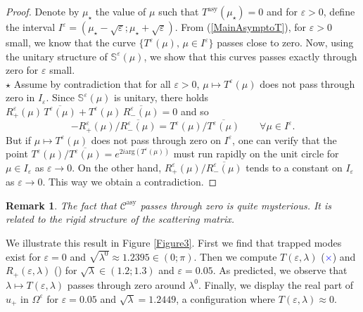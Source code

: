 \documentclass[11pt,a4paper]{report}
\newcommand{\eps}{\varepsilon}
\newcommand{\Om}{\Omega}
\newcommand{\mrm}[1]{\mathrm{#1}}
\newtheorem{remark}[theorem]{Remark}
\begin{document}
\begin{proof}
\newline
Denote by $\mu_{\star}$ the value of $\mu$ such that $T^{\mrm{asy}}(\mu_{\star})=0$ and for $\eps>0$, define the interval $I^{\eps}=(\mu_{\star}-\sqrt{\eps};\mu_{\star}+\sqrt{\eps})$.
From (\ref{MainAsymptoT}), for $\eps>0$ small, we know that the curve $\{T^{\eps}(\mu),\,\mu\in I^{\eps}\}$ passes close to zero. Now, using the unitary structure of $\mathbb{S}^{\eps}(\mu)$, we show that this curves passes exactly through zero for $\eps$ small. \\[2pt]
$\star$ 
Assume by contradiction that for all $\eps>0$, $\mu\mapsto T^{\eps}(\mu)$ does not pass through zero in $I_\eps$. Since $\mathbb{S}^{\eps}(\mu)$ is unitary, there holds $R^{\eps}_+(\mu)\,\overline{T^{\eps}(\mu)}+T^{\eps}(\mu)\,\overline{R^{\eps}_-(\mu)}=0$ and so
\[
-R^{\eps}_+(\mu)/\overline{R^{\eps}_-(\mu)}=T^{\eps}(\mu)/\overline{T^{\eps}(\mu)}\qquad\mbox{$\forall\mu\in I^{\eps}$}.
\]
But if $\mu\mapsto T^{\eps}(\mu)$ does not pass through zero on $I^{\eps}$, one can verify that the point $T^{\eps}(\mu)/\overline{T^{\eps}(\mu)}=e^{2i\mrm{arg}(T^{\eps}(\mu))}$ must run rapidly on the unit circle for $\mu\in I_\eps$ as $\eps\to0$. On the other hand, $R^{\eps}_+(\mu)/\overline{R^{\eps}_-(\mu)}$ tends to a constant on $I_\eps$ as $\eps\to0$. This way we obtain a contradiction.
\end{proof}
\begin{remark}
The fact that $\mathscr{C}^{\mrm{asy}}$ passes through zero is quite mysterious. It is related to the rigid structure of the scattering matrix. 
\end{remark} 
\noindent We illustrate this result in Figure \ref{Figure3}. First we find that trapped modes exist for $\eps=0$ and $\sqrt{\lambda^0}\approx1.2395\in(0;\pi)$. Then we compute  $T(\eps,\lambda)$ (\textcolor{blue}{$\times$}) and $R_+(\eps,\lambda)$ () for $\sqrt{\lambda}\in(1.2;1.3)$ and $\eps=0.05$. As predicted, we observe that $\lambda\mapsto T(\eps,\lambda)$  passes through zero around $\lambda^0$. Finally, we display the real part of $u_+$ in $\Om^\eps$ for $\eps=0.05$ and $\sqrt{\lambda}=1.2449$, a configuration where $T(\eps,\lambda)\approx0$.
\end{document}
